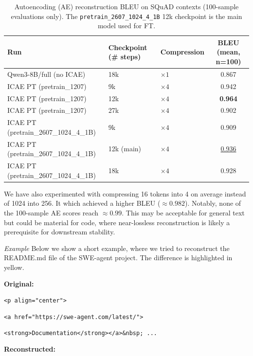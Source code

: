 \begin{table}[h]
    \centering
    \small
    \setlength{\tabcolsep}{6pt}
    \begin{tabular}{lll c}
        \toprule
        \textbf{Run} & \textbf{Checkpoint (\# steps)} & \textbf{Compression} & \textbf{BLEU (mean, n=100)} \\
        \midrule
        Qwen3-8B/full (no ICAE) & 18k & $\times 1$ & 0.867 \\
        \addlinespace
        ICAE PT (pretrain\_1207) & 9k & $\times 4$ & 0.942 \\
        ICAE PT (pretrain\_1207) & 12k & $\times 4$ & \textbf{0.964} \\
        ICAE PT (pretrain\_1207) & 27k & $\times 4$ & 0.902 \\
        \addlinespace
        ICAE PT (pretrain\_2607\_1024\_4\_1B) & 9k  & $\times 4$ & 0.909 \\
        ICAE PT (pretrain\_2607\_1024\_4\_1B) & 12k (main) & $\times 4$ & \underline{0.936} \\
        ICAE PT (pretrain\_2607\_1024\_4\_1B) & 18k & $\times 4$ & 0.928 \\
        \bottomrule
    \end{tabular}
    \caption{Autoencoding (AE) reconstruction BLEU on SQuAD contexts (100-sample evaluations only). The \texttt{pretrain\_2607\_1024\_4\_1B} 12k checkpoint is the main model used for FT.}
    \label{tab:ae_bleu_squad_ours}
\end{table}

\medskip
We have also experimented with compressing 16 tokens into 4 on average instead of 1024 into 256.
It which achieved a higher BLEU (\(\approx 0.982\)). 
Notably, none of the 100-sample AE scores reach \(\approx 0.99\).
This may be acceptable for general text but could be material for code, where near-lossless reconstruction is likely a prerequisite for downstream stability.

\medskip
\noindent\textit{Example} 
Below we show a short example, where we tried to reconstruct the README.md file of the SWE-agent project.
The difference is highlighted in yellow.

\noindent\textbf{Original:}

\quad\texttt{<p align="center">}

\quad\texttt{<a href="https://swe-agent.com/latest/">}

\quad\texttt{<strong>Documentation</strong></a>\&nbsp; ...}

\noindent\textbf{Reconstructed:}

